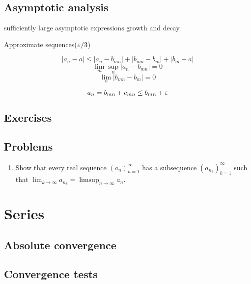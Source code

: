 \documentclass{../../large}
\begin{document}
\begin{prb}
\end{prb}


\section{Asymptotic analysis}
sufficiently large
asymptotic expressions
growth and decay

Approximate sequences($\varepsilon/3$)

\begin{prb}
\[|a_n-a|\le|a_n-b_{mn}|+|b_{mn}-b_m|+|b_m-a|\]
\[\lim_m\sup_n|a_n-b_{mn}|=0\]
\[\lim_n|b_{mn}-b_m|=0\]
\end{prb}

\[a_n=b_{mn}+c_{mn}\le b_{mn}+\varepsilon\]





\section*{Exercises}
\begin{prb}
\end{prb}
\begin{prb}
\end{prb}
\section*{Problems}
\begin{enumerate}
\item Show that every real sequence $(a_n)_{n=1}^\infty$ has a subsequence $(a_{n_k})_{k=1}^\infty$ such that $\lim_{k\to\infty}a_{n_k}=\limsup_{n\to\infty}a_n$.
\end{enumerate}





\chapter{Series}

\section{Absolute convergence}
\begin{prb}
\end{prb}


\section{Convergence tests}
\end{document}
